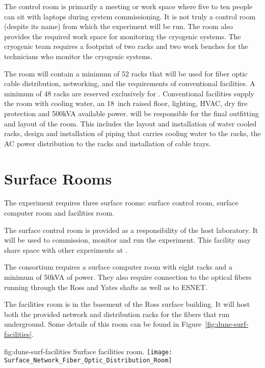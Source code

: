 The control room is primarily a meeting or work space where
five to ten people can sit with laptops during system commissioning.
It is not truly a control room (despite its name) from which the
experiment will be run.  The room also provides the required work space for
monitoring the cryogenic systems.  The cryogenic team requires a
footprint of two racks and two work benches for the technicians who monitor the cryogenic systems.
       
The  room will contain a minimum of 52 racks that will be
used for fiber optic cable distribution, networking, 
 and the requirements of conventional facilities.  A
minimum of 48 racks are reserved exclusively for .
Conventional facilities supply the  room with cooling
water, an 18~inch raised floor, lighting, HVAC, dry fire protection
and 500kVA available power.   will be responsible for
the final outfitting and layout of the room.  This includes the layout
and installation of water cooled racks, design and installation of
piping that carries cooling water to the racks, the AC power
distribution to the racks and installation of cable trays.


\section{Surface Rooms}
\label{sec:fdsp-coord-surf-rooms}


The  experiment requires three surface rooms: surface
control room,  surface computer room and  facilities room.


The  surface control room is provided as a responsibility
of the host laboratory.  It will be used to commission, monitor and
run the experiment.  This facility may share space with other
experiments at \surf.

The  consortium requires a surface computer room with eight
racks and a minimum of 50kVA of power.  They also require connection
to the optical fibers running through the Ross and Yates shafts as
well as to ESNET.


The facilities room is in the basement of the Ross surface
building.  It will host both the \fnal provided network and
distribution racks for the fibers that run underground. Some details
of this room can be found in Figure~\ref{fig:dune-surf-facilities}.
\begin{dunefigure}{fig:dune-surf-facilities}
  {Surface facilities room.}
  \texttt{[image: Surface\_Network\_Fiber\_Optic\_Distribution\_Room]}
\end{dunefigure}


